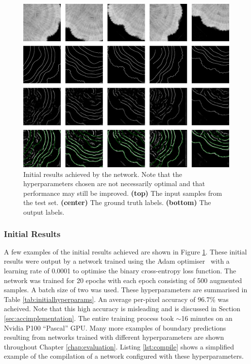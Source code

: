 \begin{figure}[t]
    \centering
    \includegraphics[width=1\textwidth]{images/initial-outputs.png}
    \caption{Initial results achieved by the network. Note that the hyperparameters chosen are not necessarily optimal and that performance may still be improved. \textbf{(top)} The input samples from the test set. \textbf{(center)} The ground truth labels. \textbf{(bottom)} The output labels.}
    \label{fig:outputs}
\end{figure}

\subsubsection{Initial Results}

A few examples of the initial results achieved are shown in Figure \ref{fig:outputs}. These initial results were output by a network trained using the Adam optimiser~\cite{adam} with a learning rate of 0.0001 to optimise the binary cross-entropy loss function. The network was trained for 20 epochs with each epoch consisting of 500 augmented samples. A batch size of two was used. These hyperparameters are summarised in Table \ref{tab:initialhyperparams}. An average per-pixel accuracy of 96.7\% was acheived. Note that this high accuracy is misleading and is discussed in Section \ref{sec:accimplementation}. The entire training process took ${\sim}$16 minutes on an Nvidia P100 ``Pascal'' GPU. Many more examples of boundary predictions resulting from networks trained with different hyperparameters are shown throughout Chapter \ref{chap:evaluation}. Listing \ref{lst:compile} shows a simplified example of the compilation of a network configured with these hyperparameters.

